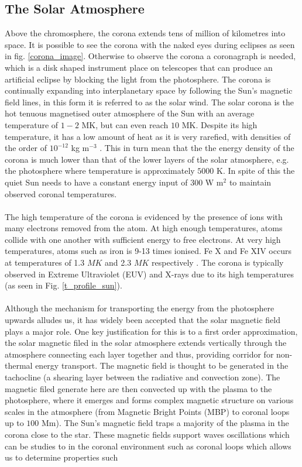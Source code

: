\documentclass[12pt]{ociamthesis}
\begin{document}
\subsection{The Solar Atmosphere}
\label{subsec:so_atmos}
Above the chromosphere, the corona extends tens of million of kilometres into space. It is possible to see the corona with the naked eyes during eclipses as seen in fig. \ref{corona_image}. Otherwise to observe the corona a coronagraph is needed, which is a disk shaped instrument place on telescopes that can produce an artificial eclipse by blocking the light from the photosphere. The corona is continually expanding into interplanetary space by following the Sun's magnetic field lines, in this form it is referred to as the solar wind. The solar corona is the hot tenuous magnetised outer atmosphere of the Sun with an average temperature of $1-2$ MK, but can even reach $10$ MK. Despite its high temperature, it has a low amount of heat as it is very rarefied, with densities of the order of $10^{-12}$ kg m$^{-3}$ \citep{priest2014magnetohydrodynamics}. This in turn mean that the the energy density of the corona is much lower than that of the lower layers of the solar atmosphere, e.g. the photosphere where temperature is approximately $5000$ K. In spite of this the quiet Sun needs to have a constant energy input of $300$ W m$^2$ \citep{priest2014magnetohydrodynamics} to maintain observed coronal temperatures. \\ \\ The high temperature of the corona is evidenced by the presence of ions with many electrons removed from the atom. At high enough temperatures, atoms collide with one another with sufficient energy to free electrons. At very high temperatures, atoms such as iron is 9-13 times ionised. Fe X and Fe XIV occurs at temperatures of 1.3 $MK$ and 2.3  $MK$ respectively \citep{narayanan2014introduction}. The corona is typically observed in Extreme Ultraviolet (EUV) and X-rays due to its high temperatures (as seen in Fig. \ref{t_profile_sun}). \\ \\ Although the mechanism for transporting the energy from the photosphere upwards alludes us, it has widely been accepted that the solar magnetic field plays a major role. One key justification for this is to a first order approximation, the solar magnetic filed in the solar atmosphere extends vertically through the atmosphere connecting each layer together and thus, providing corridor for non-thermal energy transport. The magnetic field is thought to be generated in the tachocline (a shearing layer between the radiative and convection zone). The magnetic filed generate here are then convected up with the plasma to the photosphere, where it emerges and forms complex magnetic structure on various scales in the atmosphere (from Magnetic Bright Points (MBP) to coronal loops up to $100$ Mm). The Sun's magnetic field traps a majority of the plasma in the corona close to the star. These magnetic fields support waves oscillations which can be studies to in the coronal environment such as coronal loops which allows us to determine properties such 
\end{document}
